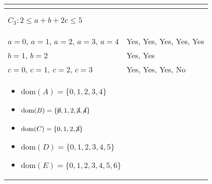 \begin{example}
\begin{center}
\begin{tabular}{ll}
{\begin{itemize}
            \end{itemize}} \\
            \midrule
            \multicolumn{2}{p{\linewidth}}{
            \begin{center}
                $C_3: 2 \leq a + b + 2c \leq 5$
            \end{center}} \\
            \midrule
                $a=0$, $a=1$, $a=2$, $a=3$, $a=4$ & Yes, Yes, Yes, Yes, Yes \\
                $b=1$, $b=2$ & Yes, Yes \\
                $c=0$, $c=1$, $c=2$, $c=3$ & Yes, Yes, Yes, No \\

            \multicolumn{2}{p{\linewidth}}{
            \begin{itemize}
                \item $\text{dom}(A) = \{0, 1, 2, 3, 4\}$
                \item $\text{dom}(B) = \{\cancel{0}, 1, 2, \cancel{3}, \cancel{4}\} $
                \item $\text{dom}(C) = \{0, 1, 2, \cancel{3}\} $
                \item $\text{dom}(D) = \{0, 1, 2, 3, 4, 5\} $
                \item $\text{dom}(E) = \{0, 1, 2, 3, 4, 5, 6\} $
            \end{itemize}} \\
            \midrule
        \end{tabular}
    \end{center}
\end{example}
\newpage

